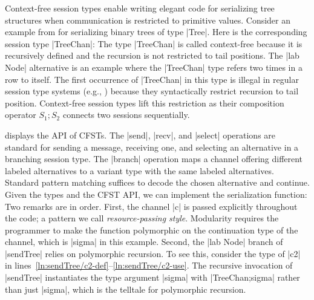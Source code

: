Context-free session types enable writing elegant code for
serializing tree structures when communication is restricted to
primitive values.
Consider an example from \citet{DBLP:conf/icfp/ThiemannV16} for serializing
binary trees of type |Tree|.
%
\DefnTree
%
\noindent Here is the corresponding session type |TreeChan|:
%
\DefnTreeChan
%
\noindent The type |TreeChan| is called context-free because it is
recursively defined and the recursion is not restricted to tail
positions. The |lab Node| alternative is an example where the
|TreeChan| type refers two times in a row to itself. The
first occurrence of |TreeChan| in this
type is illegal in regular session type systems (e.g.,
\citet{DBLP:journals/jfp/GayV10,DBLP:conf/esop/LindleyM15,Gay_Vasconcelos_2025}) because
they syntactically restrict recursion to tail position. Context-free
session types lift this restriction as their composition operator $S_1;S_2$ connects
two sessions sequentially.

 displays the API of CFSTs. The |send|, |recv|, and |select|
operations are standard for sending a message, receiving one, and selecting an
alternative in a branching session type. The |branch| operation maps a channel
offering different labeled alternatives to a variant type with the same labeled
alternatives. Standard pattern matching suffices to decode the chosen
alternative and continue. Given the types and the CFST API, we can implement the
serialization function:
%
\NumberedCode\CodeSendTree
%
\noindent Two remarks are in order. First, the channel |c| is passed
explicitly throughout the code; a pattern we call \emph{resource-passing
  style}. Modularity requires the programmer to make the function polymorphic on
the continuation type of the channel, which is |sigma| in this example. Second,
the |lab Node| branch of |sendTree| relies on polymorphic recursion. To see
this, consider the type of |c2| in
lines~\ref*{ln:sendTree/c2-def}--\ref*{ln:sendTree/c2-use}. The recursive
invocation of |sendTree| instantiates the type argument |sigma| with
|TreeChan;sigma| rather than just |sigma|, which is the telltale for polymorphic
recursion.

